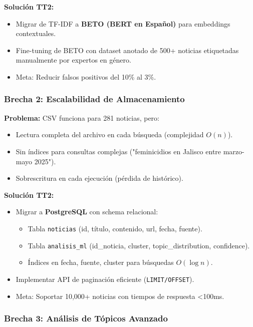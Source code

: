 \textbf{Solución TT2:}
\begin{itemize}
    \item Migrar de TF-IDF a \textbf{BETO (BERT en Español)} para embeddings contextuales.
    \item Fine-tuning de BETO con dataset anotado de 500+ noticias etiquetadas manualmente por expertos en género.
    \item Meta: Reducir falsos positivos del 10\% al 3\%.
\end{itemize}

\subsubsection{Brecha 2: Escalabilidad de Almacenamiento}

\textbf{Problema:} CSV funciona para 281 noticias, pero:
\begin{itemize}
    \item Lectura completa del archivo en cada búsqueda (complejidad $O(n)$).
    \item Sin índices para consultas complejas ("feminicidios en Jalisco entre marzo-mayo 2025").
    \item Sobrescritura en cada ejecución (pérdida de histórico).
\end{itemize}

\textbf{Solución TT2:}
\begin{itemize}
    \item Migrar a \textbf{PostgreSQL} con schema relacional:
    \begin{itemize}
        \item Tabla \texttt{noticias} (id, título, contenido, url, fecha, fuente).
        \item Tabla \texttt{analisis\_ml} (id\_noticia, cluster, topic\_distribution, confidence).
        \item Índices en fecha, fuente, cluster para búsquedas $O(\log n)$.
    \end{itemize}
    \item Implementar API de paginación eficiente (\texttt{LIMIT/OFFSET}).
    \item Meta: Soportar 10,000+ noticias con tiempos de respuesta <100ms.
\end{itemize}

\subsubsection{Brecha 3: Análisis de Tópicos Avanzado}

